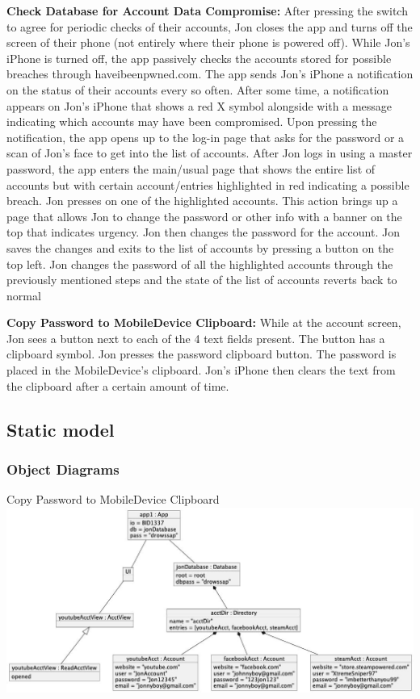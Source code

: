 \documentclass[stu]{apa7}
\begin{document}
\textbf{Check Database for Account Data Compromise:} After pressing the switch to agree for periodic checks of their accounts, Jon closes the app and turns off the screen of their phone (not entirely where their phone is powered off). While Jon’s iPhone is turned off, the app passively checks the accounts stored for possible breaches through haveibeenpwned.com. The app sends Jon’s iPhone a notification on the status of their accounts every so often. After some time, a notification appears on Jon's iPhone that shows a red X symbol alongside with a message indicating which accounts may have been compromised. Upon pressing the notification, the app opens up to the log-in page that asks for the password or a scan of Jon’s face to get into the list of accounts. After Jon logs in using a master password, the app enters the main/usual page that shows the entire list of accounts but with certain account/entries highlighted in red indicating a possible breach. Jon presses on one of the highlighted accounts. This action brings up a page that allows Jon to change the password or other info with a banner on the top that indicates urgency. Jon then changes the password for the account.  Jon saves the changes and exits to the list of accounts by pressing a button on the top left. Jon changes the password of all the highlighted accounts through the previously mentioned steps and the state of the list of accounts reverts back to normal

\textbf{Copy Password to MobileDevice Clipboard:} While at the account screen, Jon sees a button next to each of the 4 text fields present. The button has a clipboard symbol. Jon presses the password clipboard button. The password is placed in the MobileDevice’s clipboard. Jon’s iPhone then clears the text from the clipboard after a certain amount of time.


\subsection{Static model}

\subsubsection{Object Diagrams}

Copy Password to MobileDevice Clipboard \\
\includegraphics[width=\textwidth]{diag/rjm/o1.jpg}
\end{document}
